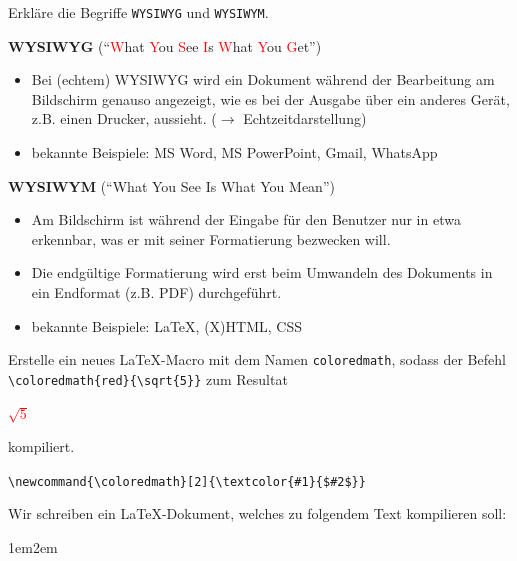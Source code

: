 \begin{questions}


\question[2] Erkläre die Begriffe \texttt{WYSIWYG} und \texttt{WYSIWYM}.
	\begin{solution}
		\phantom{1}

	\textbf{WYSIWYG} (\enquote{\textcolor{Red}{W}hat \textcolor{Red}{Y}ou \textcolor{Red}{S}ee \textcolor{Red}{I}s \textcolor{Red}{W}hat \textcolor{Red}{Y}ou \textcolor{Red}{G}et})

	\begin{itemize}
		\item 
	Bei (echtem) WYSIWYG wird ein Dokument während der Bearbeitung am Bildschirm genauso angezeigt, wie es bei der Ausgabe über ein anderes Gerät, z.B. einen Drucker, aussieht. ($\rightarrow$ Echtzeitdarstellung)
		\item 
	bekannte Beispiele: MS Word, MS PowerPoint, Gmail, WhatsApp
	\end{itemize}

	\textbf{WYSIWYM} (\enquote{\textcolor{NavyBlue}{W}hat \textcolor{NavyBlue}{Y}ou \textcolor{NavyBlue}{S}ee \textcolor{NavyBlue}{I}s \textcolor{NavyBlue}{W}hat \textcolor{NavyBlue}{Y}ou \textcolor{NavyBlue}{M}ean})

	\begin{itemize}
		\item 
	Am Bildschirm ist während der Eingabe für den Benutzer nur in etwa erkennbar, was er mit seiner Formatierung bezwecken will.
		\item
	Die endgültige Formatierung wird erst beim Umwandeln des Dokuments in ein Endformat (z.B. PDF) durchgeführt.
		\item
	bekannte Beispiele: \LaTeX, (X)HTML, CSS
	\end{itemize}
	\end{solution}

\question[2] Erstelle ein neues \LaTeX-Macro mit dem Namen \lstinline[style=LaTeX]|coloredmath|, sodass der Befehl \lstinline[style=LaTeX]|\coloredmath{red}{\sqrt{5}}| zum Resultat
\begin{center}
	\textcolor{Red}{$\sqrt{5}$}
\end{center}
kompiliert.
	\begin{solution}
		\lstinline[style=LaTeX]|\newcommand{\coloredmath}[2]{\textcolor{#1}{$#2$}}|
	\end{solution}

\question[2]
Wir schreiben ein \LaTeX-Dokument, welches zu folgendem Text kompilieren soll:
\begin{adjustwidth}{1em}{2em}

\end{adjustwidth}
\end{questions}

